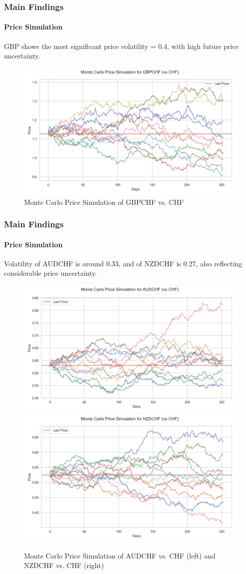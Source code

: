 \documentclass[10pt]{beamer}
\begin{document}
\begin{frame}
\frametitle{Main Findings}
\framesubtitle{Price Simulation}
GBP shows the most significant price volatility = 0.4, with high future price uncertainty.
\begin{figure}[h]
    \centering  \includegraphics[width=0.75\linewidth]{../../reports/figures/monte_carlo_price_simulation_GBPCHF_vs_CHF.png}
    \caption{Monte Carlo Price Simulation of GBPCHF vs. CHF}  \label{fig:monte_carlo_price_simulation_GBPCHF_vs_CHF}
\end{figure}
\end{frame}
\begin{frame}
\frametitle{Main Findings}
\framesubtitle{Price Simulation}
Volatility of AUDCHF is around 0.33, and of NZDCHF is 0.27, also reflecting considerable price uncertainty.
\begin{figure}[h]
    \centering
    \includegraphics[width=0.48\linewidth]{../../reports/figures/monte_carlo_price_simulation_AUDCHF_vs_CHF.png}    \label{fig:monte_carlo_price_simulation_AUDCHF_vs_CHF}
    \includegraphics[width=0.48\linewidth]{../../reports/figures/monte_carlo_price_simulation_NZDCHF_vs_CHF.png}  \label{fig:monte_carlo_price_simulation_NZDCHF_vs_CHF}
    \caption{Monte Carlo Price Simulation of AUDCHF vs. CHF (left) and NZDCHF vs. CHF (right)} 
\end{figure}
\end{frame}
\end{document}
